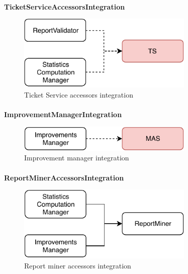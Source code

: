 			\paragraph{}
				\textbf{TicketServiceAccessorsIntegration}
					\begin{figure}[!h]
						\centering
						\includegraphics[width=0.75\textwidth]{images/Integration/TicketServiceAccessorsIntegration.pdf}
						\caption{Ticket Service accessors integration}
					\end{figure}
			\clearpage
			\paragraph{}
				\textbf{ImprovementManagerIntegration}
					\begin{figure}[!h]
						\centering
						\includegraphics[width=0.75\textwidth]{images/Integration/ImprovementManagerIntegration.pdf}
						\caption{Improvement manager integration}
					\end{figure}
			\paragraph{}
				\textbf{ReportMinerAccessorsIntegration}
					\begin{figure}[!h]
						\centering
						\includegraphics[width=0.75\textwidth]{images/Integration/ReportMinerAccessorsIntegration.pdf}
						\caption{Report miner accessors integration}
					\end{figure}
